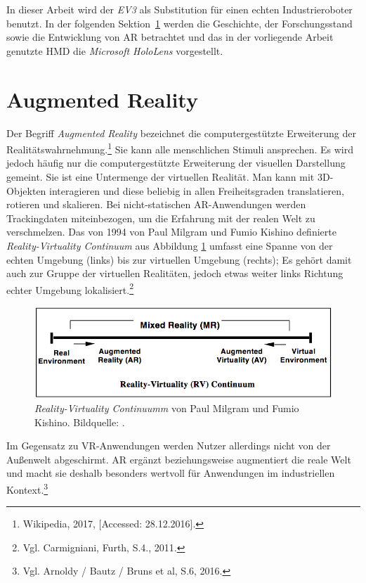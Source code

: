 In dieser Arbeit wird der \textit{EV3} als Substitution für einen echten Industrieroboter benutzt. In der folgenden Sektion~\ref{sec:ar} werden die Geschichte, der Forschungsstand sowie die Entwicklung von AR betrachtet und das in der vorliegende Arbeit genutzte HMD die \textit{Microsoft HoloLens} vorgestellt.
\section{Augmented Reality}\label{sec:ar}
Der Begriff \textit{Augmented Reality} bezeichnet \frqq die computergestützte Erweiterung der Realitätswahrnehmung\flqq.\footnote{ Wikipedia, 2017, [Accessed: 28.12.2016].} Sie kann alle menschlichen Stimuli ansprechen. Es wird jedoch häufig nur die computergestützte Erweiterung der visuellen Darstellung gemeint. Sie ist eine Untermenge der virtuellen Realität. Man kann mit 3D-Objekten interagieren und diese beliebig in allen Freiheitsgraden translatieren, rotieren und skalieren. Bei nicht-statischen AR-Anwendungen werden Trackingdaten miteinbezogen, um die Erfahrung mit der realen Welt zu verschmelzen. Das von 1994 von Paul Milgram und Fumio Kishino definierte \textit{Reality-Virtuality Continuum} aus Abbildung \ref{fig:rv_continuum} umfasst eine Spanne von der echten Umgebung (links) bis zur virtuellen Umgebung (rechts); Es gehört damit auch zur Gruppe der virtuellen Realitäten, jedoch etwas weiter links Richtung echter Umgebung lokalisiert.\footnote{ Vgl. Carmigniani, Furth, S.4., 2011.}
\begin{figure}[H]
	\centering
	\includegraphics[width=1.0\textwidth]{figuren/milgram_rv_continuum}
	\caption{\textit{Reality-Virtuality Continuumm} von Paul Milgram und Fumio Kishino. Bildquelle: \cite{continuum}.}
	\label{fig:rv_continuum}
\end{figure}
Im Gegensatz zu VR-Anwendungen werden Nutzer allerdings nicht von der Außenwelt abgeschirmt. AR ergänzt beziehungsweise augmentiert die reale Welt und macht sie deshalb besonders wertvoll für Anwendungen im industriellen Kontext.\footnote{ Vgl. Arnoldy / Bautz / Bruns et al, S.6, 2016.}
